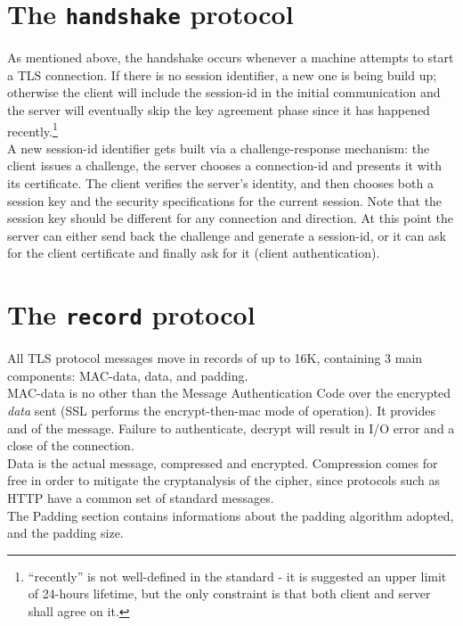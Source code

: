 \section{The \texttt{handshake} protocol}
As mentioned above, the handshake occurs whenever a machine attempts to start
a TLS connection. If there is no session identifier, a new one is being build
up; otherwise the client will include the session-id in the initial
communication and the server will eventually skip the key agreement phase since
it has happened recently.\footnote{``recently'' is not well-defined in
  the standard - it is suggested an upper limit of 24-hours lifetime, but the
  only constraint is that both client and server shall agree on it.}\\
A new session-id identifier gets built via a challenge-response mechanism: the
client issues a challenge, the server chooses a connection-id and presents it
with its certificate. The client verifies the server's identity, and then
chooses both a session key and the security specifications for the current
session. Note that the session key should be different for any connection and
direction. At this point the server can either send back the challenge and
generate a session-id, or it can ask for the client
certificate and finally ask for it (client authentication).

\vfill
\section{The \texttt{record} protocol}
All TLS protocol messages move in records of up to 16K, containing 3
main components: MAC-data, data, and padding.
\\
{MAC-data} is no other than the Message Authentication Code over the
encrypted \emph{data} sent
(SSL performs the encrypt-then-mac mode of operation).
It provides  and  of the message.
Failure to authenticate, decrypt will result in I/O error and a close of the
connection.
\\
{Data} is the actual message, compressed and encrypted. Compression comes
for free in order to mitigate the cryptanalysis of the cipher, since protocols
such as HTTP have a common set of standard messages.
\\
The {Padding} section contains informations about the padding algorithm
adopted, and the padding size.

